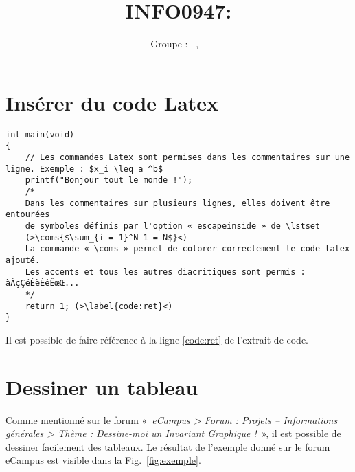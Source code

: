
\title{INFO0947: \intitule}
\author{Groupe \GrNbr : \PrenomUN~\textsc{\NomUN}, \PrenomDEUX~\textsc{\NomDEUX}}
\date{}


\maketitle
\newpage
\tablemat
\newpage


\section{Insérer du code Latex}

\begin{lstlisting}[caption={Un programme tout simple}]
int main(void)
{
	// Les commandes Latex sont permises dans les commentaires sur une ligne. Exemple : $x_i \leq a ^b$
	printf("Bonjour tout le monde !");
	/*
	Dans les commentaires sur plusieurs lignes, elles doivent être entourées
	de symboles définis par l'option « escapeinside » de \lstset
	(>\coms{$\sum_{i = 1}^N 1 = N$}<)
	La commande « \coms » permet de colorer correctement le code latex ajouté.
	Les accents et tous les autres diacritiques sont permis : àÀçÇéÉèÈêÊœŒ...
	*/
	return 1; (>\label{code:ret}<)
}
\end{lstlisting}

Il est possible de faire référence à la ligne \ref{code:ret} de l'extrait de code.

\section{Dessiner un tableau}

Comme mentionné sur le forum «~\emph{eCampus > Forum : Projets -- Informations générales > Thème : Dessine-moi un Invariant Graphique !}~», il est possible de dessiner facilement des tableaux. Le résultat de l'exemple donné sur le forum eCampus est visible dans la Fig.~\ref{fig:exemple}.

